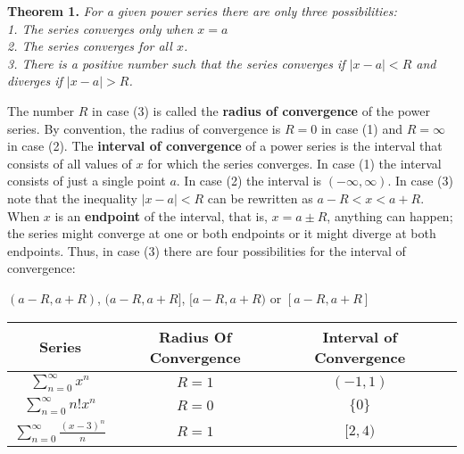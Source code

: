 \documentclass[10pt]{article}
\begin{document}
    \begin{normalsize}
    \noindent
\textbf{Theorem 1.}  
\textit{For a given power series there are only three possibilities:}\\

    \textit{1. The series converges only when $x = a$} \\
    
    \textit{2. The series converges for all $x$.}\\
    
    \textit{3. There is a positive number such that the series converges if $\left|{x-a}\right| < R$ and diverges if $\left|{x-a}\right| > R$.}\\
     \end{normalsize}
     \begin{normalsize}
     \par
     {The number $R$ in case (3) is called the \textbf{ radius of convergence} of the power series. By convention, the radius of convergence is $R = 0$ in case (1) and $R = \infty$ in case (2). The \textbf{interval of convergence} of a power series is the interval that consists of all values of $x$ for which the series converges. In case (1) the interval consists of just a single point $a$. In case (2) the interval is  $(-\infty,\infty)$. In case (3) note that the inequality $\left|{x-a}\right|< R$ can be rewritten as $a-R < x < a + R$. When $x$ is an \textbf{endpoint} of the interval, that is, $x =a \pm R$, anything can happen; the series might converge at one or both endpoints or it might diverge at both endpoints. Thus, in case (3) there are four possibilities for the interval of convergence: }
     \begin{center}
         $(a-R,a+R)$, $(a-R,a+R]$, $[a-R,a+R)$ {or} $[a-R,a+R]$
         
     \end{center}
     \begin{center}
         \begin{tabular}{|c|c|c|c|}
\hline
Series & Radius Of Convergence & Interval of Convergence \\
\hline
$\sum_{n=0}^{\infty}x^n$ & $R=1$ & $(-1,1)$ \\
\hline
$\sum_{n=0}^{\infty}n!x^n$ & $R=0$ & $\{0\}$ \\

\hline
$\sum_{n=0}^{\infty}\frac{(x-3)^n}{n}$ & $R=1$ & $[2,4)$ \\
\hline
\end{tabular}
     \end{center}
     \end{normalsize}
     
        
   
   
    
\end{document}
